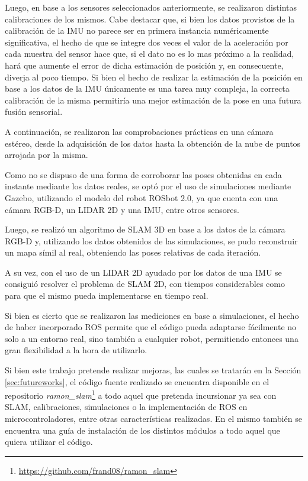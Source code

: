 Luego, en base a los sensores seleccionados anteriormente, se realizaron distintas calibraciones de los mismos. Cabe destacar que, si bien los datos provistos de la calibración de la IMU no parece ser en primera instancia numéricamente significativa, el hecho de que se integre dos veces el valor de la aceleración por cada muestra del sensor hace que, si el dato no es lo mas próximo a la realidad, hará que aumente el error de dicha estimación de posición y, en consecuente, diverja al poco tiempo. Si bien el hecho de realizar la estimación de la posición en base a los datos de la IMU únicamente es una tarea muy compleja, la correcta calibración de la misma permitiría una mejor estimación de la pose en una futura fusión sensorial.

A continuación, se realizaron las comprobaciones prácticas en una cámara estéreo, desde la adquisición de los datos hasta la obtención de la nube de puntos arrojada por la misma.

Como no se dispuso de una forma de corroborar las poses obtenidas en cada instante mediante los datos reales, se optó por el uso de simulaciones mediante Gazebo, utilizando el modelo del robot ROSbot 2.0, ya que cuenta con una cámara RGB-D, un LIDAR 2D y una IMU, entre otros sensores.

Luego, se realizó un algoritmo de SLAM 3D en base a los datos de la cámara RGB-D y, utilizando los datos obtenidos de las simulaciones, se pudo reconstruir un mapa símil al real, obteniendo las poses relativas de cada iteración.

A su vez, con el uso de un LIDAR 2D ayudado por los datos de una IMU se consiguió resolver el problema de SLAM 2D, con tiempos considerables como para que el mismo pueda implementarse en tiempo real.

Si bien es cierto que se realizaron las mediciones en base a simulaciones, el hecho de haber incorporado ROS permite que el código pueda adaptarse fácilmente no solo a un entorno real, sino también a cualquier robot, permitiendo entonces una gran flexibilidad a la hora de utilizarlo.

Si bien este trabajo pretende realizar mejoras, las cuales se tratarán en la Sección \ref{sec:futureworks}, el código fuente realizado se encuentra disponible en el repositorio \textit{ramon\_slam}\footnote{\url{https://github.com/frand08/ramon_slam}} a todo aquel que pretenda incursionar ya sea con SLAM, calibraciones, simulaciones o la implementación de ROS en microcontroladores, entre otras características realizadas. En el mismo también se encuentra una guía de instalación de los distintos módulos a todo aquel que quiera utilizar el código.


\fi